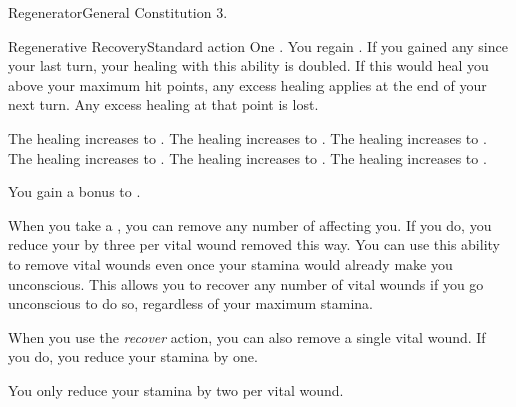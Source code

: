   \begin{feat}{Regenerator}{General}
    \featpre Constitution 3.

    \begin{activeability}{Regenerative Recovery}{Standard action}
      \abilitycost One .
      \rankline
      You regain \hprankthreelow.
      If you gained any  since your last turn, your healing with this ability is doubled.
      If this would heal you above your maximum hit points, any excess healing applies at the end of your next turn.
      Any excess healing at that point is lost.

      \rankline
       The healing increases to \hprankfourlow.
       The healing increases to \hprankfivelow.
       The healing increases to \hpranksixlow.
       The healing increases to \hpranksevenlow.
       The healing increases to \hprankeightlow.
       The healing increases to \hprankninelow.
    \end{activeability}

     You gain a  bonus to .

     When you take a , you can remove any number of  affecting you.
    If you do, you reduce your  by three per vital wound removed this way.
    You can use this ability to remove vital wounds even once your stamina would already make you unconscious.
    This allows you to recover any number of vital wounds if you go unconscious to do so, regardless of your maximum stamina.

     When you use the \textit{recover} action, you can also remove a single vital wound.
    If you do, you reduce your stamina by one.

     You only reduce your stamina by two per vital wound.
  \end{feat}

